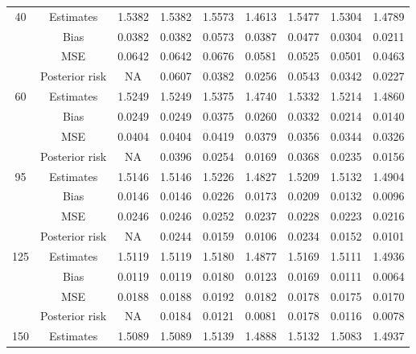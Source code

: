\documentclass[a4paper,12pt]{report}
\begin{document}
\begin{minipage}{\linewidth}
{\begin{tabular}{|c|c|c|c|c|c|c|c|c|}
			40&		Estimates      &1.5382 &1.5382 &1.5573 &1.4613 &1.5477 &1.5304 &1.4789 \\
			&Bias           &0.0382 &0.0382 &0.0573 &0.0387 &0.0477 &0.0304 &0.0211 \\
			&MSE            &0.0642 &0.0642 &0.0676 &0.0581 &0.0525 &0.0501 &0.0463 \\
			&Posterior risk    &NA &0.0607 &0.0382 &0.0256 &0.0543 &0.0342 &0.0227 \\ \hline
			60&		Estimates      &1.5249 &1.5249 &1.5375 &1.4740 &1.5332 &1.5214 &1.4860 \\
			&Bias           &0.0249 &0.0249 &0.0375 &0.0260 &0.0332 &0.0214 &0.0140 \\
			&MSE            &0.0404 &0.0404 &0.0419 &0.0379 &0.0356 &0.0344 &0.0326 \\
			&Posterior risk    &NA &0.0396 &0.0254 &0.0169 &0.0368 &0.0235 &0.0156 \\\hline
			95&		Estimates      &1.5146 &1.5146 &1.5226 &1.4827 &1.5209 &1.5132 &1.4904 \\
			&Bias           &0.0146 &0.0146 &0.0226 &0.0173 &0.0209 &0.0132 &0.0096 \\
			&MSE            &0.0246 &0.0246 &0.0252 &0.0237 &0.0228 &0.0223 &0.0216 \\
			&Posterior risk    &NA &0.0244 &0.0159 &0.0106 &0.0234 &0.0152 &0.0101 \\ \hline
			125&	Estimates      &1.5119 &1.5119 &1.5180 &1.4877 &1.5169 &1.5111 &1.4936 \\
			&Bias           &0.0119 &0.0119 &0.0180 &0.0123 &0.0169 &0.0111 &0.0064 \\
			&MSE            &0.0188 &0.0188 &0.0192 &0.0182 &0.0178 &0.0175 &0.0170 \\
			&Posterior risk    &NA &0.0184 &0.0121 &0.0081 &0.0178 &0.0116 &0.0078 \\ \hline
			150&	Estimates      &1.5089 &1.5089 &1.5139 &1.4888 &1.5132 &1.5083 &1.4937 \\

\end{tabular}}
\end{minipage}
\end{document}
